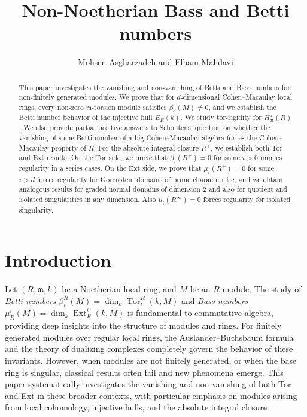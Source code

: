 \documentclass[11pt,a4paper]{amsart}
\numberwithin{equation}{section}
\theoremstyle{definition}
\theoremstyle{remark}
\begin{document}
	
\author[M. Asgharzadeh and E. Mahdavi]{Mohsen Asgharzadeh and Elham Mahdavi}
	\date{}
\title[Non-Noetherian Bass and Betti numbers]{Non-Noetherian Bass and Betti numbers}
	
\address{M. Asgharzadeh}
	
\address{E. Mahdavi}
	
	
\begin{abstract}
This paper investigates the vanishing and non-vanishing of Betti  and Bass numbers  for  non-finitely generated modules. We prove that for \(d\)-dimensional Cohen--Macaulay local rings, every non-zero \(\mathfrak{m}\)-torsion module satisfies \(\beta_d(M)\neq 0\), and we establish the Betti number behavior of the injective hull \(E_R(k)\). We study tor-rigidity for \(H^d_{\mathfrak{m}}(R)\). We also provide partial positive answers to Schoutens' question on whether the vanishing of some Betti number  of a big Cohen--Macaulay algebra forces the Cohen--Macaulay property of \(R\). For the absolute integral closure \(R^+\), we establish both Tor and Ext results. On the Tor side, we prove that \(\beta_i(R^+)=0\) for some \(i>0\) implies regularity in a series cases. On the Ext side, we prove that \(\mu_i(R^+)=0\) for some \(i> d\) forces regularity for Gorenstein domains of prime characteristic, and we obtain analogous results for graded normal domains of dimension \(2\) and also for quotient and isolated singularities in any dimension. Also $\mu_i(R^\infty)=0$ forces regularity for isolated singularity.
	\end{abstract}
	
	\maketitle
	
\section{Introduction}
Let \((R,\mathfrak{m},k)\) be a Noetherian local ring, and $M$ be an $R$-module.
The study of \textit{Betti numbers} \(\beta_i^R(M)=\dim_k \operatorname{Tor}_i^R(k,M)\) and \textit{Bass numbers} \(\mu^i_R(M)=\dim_k \operatorname{Ext}_R^i(k,M)\) is fundamental to commutative algebra, providing deep insights into the structure of modules and rings. For finitely generated modules over regular local rings, the Auslander--Buchsbaum formula and the theory of dualizing complexes completely govern the behavior of these invariants. However, when modules are not finitely generated, or when the base ring is singular, classical results often fail and new phenomena emerge. This paper systematically investigates the vanishing and non-vanishing of both Tor and Ext in these broader contexts, with particular emphasis on modules arising from local cohomology, injective hulls, and the absolute integral closure.
	
\end{document}
